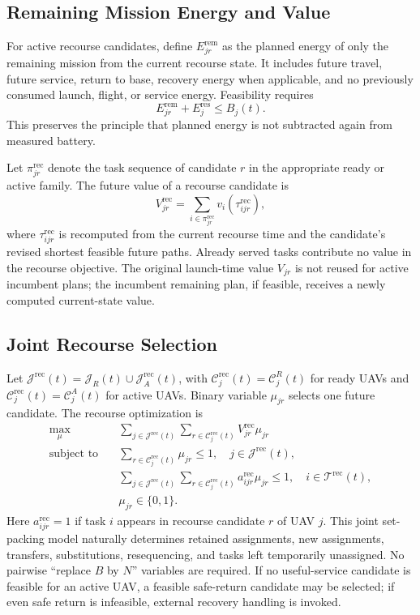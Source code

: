 \documentclass[conference]{IEEEtran}
\begin{document}
\subsection{Remaining Mission Energy and Value}
For active recourse candidates, define $E_{jr}^{\mathrm{rem}}$ as the planned energy of only the remaining mission from the current recourse state. It includes future travel, future service, return to base, recovery energy when applicable, and no previously consumed launch, flight, or service energy. Feasibility requires
\begin{equation}
E_{jr}^{\mathrm{rem}}+E_j^{\mathrm{res}}\leq B_j(t).
\end{equation}
This preserves the principle that planned energy is not subtracted again from measured battery.

Let $\pi_{jr}^{\mathrm{rec}}$ denote the task sequence of candidate $r$ in the appropriate ready or active family. The future value of a recourse candidate is
\begin{equation}
V_{jr}^{\mathrm{rec}}=\sum_{i\in\pi_{jr}^{\mathrm{rec}}}v_i(\tau_{ijr}^{\mathrm{rec}}),
\end{equation}
where $\tau_{ijr}^{\mathrm{rec}}$ is recomputed from the current recourse time and the candidate's revised shortest feasible future paths. Already served tasks contribute no value in the recourse objective. The original launch-time value $V_{jr}$ is not reused for active incumbent plans; the incumbent remaining plan, if feasible, receives a newly computed current-state value.

\subsection{Joint Recourse Selection}
Let $\mathcal J^{\mathrm{rec}}(t)=\mathcal J_R(t)\cup\mathcal J_A^{\mathrm{rec}}(t)$, with $\mathcal C_j^{\mathrm{rec}}(t)=\mathcal C_j^R(t)$ for ready UAVs and $\mathcal C_j^{\mathrm{rec}}(t)=\mathcal C_j^A(t)$ for active UAVs. Binary variable $\mu_{jr}$ selects one future candidate. The recourse optimization is
\begin{align}
\max_{\mu}\quad&
\sum_{j\in\mathcal J^{\mathrm{rec}}(t)}
\sum_{r\in\mathcal C_j^{\mathrm{rec}}(t)}
V_{jr}^{\mathrm{rec}}\mu_{jr}\\
\text{subject to}\quad&
\sum_{r\in\mathcal C_j^{\mathrm{rec}}(t)}\mu_{jr}\leq1,
\quad j\in\mathcal J^{\mathrm{rec}}(t),\\
&\sum_{j\in\mathcal J^{\mathrm{rec}}(t)}
\sum_{r\in\mathcal C_j^{\mathrm{rec}}(t)}
a_{ijr}^{\mathrm{rec}}\mu_{jr}\leq1,
\quad i\in\mathcal T^{\mathrm{rec}}(t),\\
&\mu_{jr}\in\{0,1\}.
\end{align}
Here $a_{ijr}^{\mathrm{rec}}=1$ if task $i$ appears in recourse candidate $r$ of UAV $j$. This joint set-packing model naturally determines retained assignments, new assignments, transfers, substitutions, resequencing, and tasks left temporarily unassigned. No pairwise ``replace $B$ by $N$'' variables are required. If no useful-service candidate is feasible for an active UAV, a feasible safe-return candidate may be selected; if even safe return is infeasible, external recovery handling is invoked.
\end{document}
